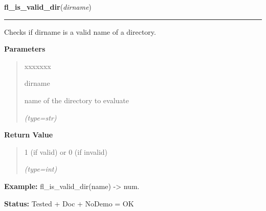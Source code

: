     \label{xformslib:flfilesys:fl_is_valid_dir}

    \vspace{0.5ex}

\hspace{.8\funcindent}\begin{boxedminipage}{\funcwidth}

    \raggedright \textbf{fl\_is\_valid\_dir}(\textit{dirname})

    \vspace{-1.5ex}

    \rule{\textwidth}{0.5\fboxrule}
\setlength{\parskip}{2ex}
    Checks if dirname is a valid name of a directory.

\setlength{\parskip}{1ex}
      \textbf{Parameters}
      \vspace{-1ex}

      \begin{quote}
        \begin{Ventry}{xxxxxxx}

          \item[dirname]

          name of the directory to evaluate

            {\it (type=str)}

        \end{Ventry}

      \end{quote}

      \textbf{Return Value}
    \vspace{-1ex}

      \begin{quote}
      1 (if valid) or 0 (if invalid)

      {\it (type=int)}

      \end{quote}

\textbf{Example:} fl\_is\_valid\_dir(name) -{\textgreater} num.



\textbf{Status:} Tested + Doc + NoDemo = OK



    \end{boxedminipage}

    \label{xformslib:flfilesys:fl_fmtime}

